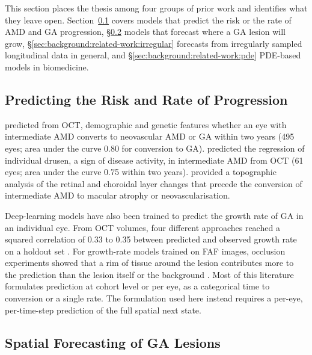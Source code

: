 This section places the thesis among four groups of prior work and
identifies what they leave open.
Section~\ref{sec:background:related-work:rate} covers models that predict
the risk or the rate of AMD and GA progression,
\S\ref{sec:background:related-work:spatial} models that forecast where a
GA lesion will grow, \S\ref{sec:background:related-work:irregular}
forecasts from irregularly sampled longitudinal data in general, and
\S\ref{sec:background:related-work:pde} PDE-based models in biomedicine.

\subsection{Predicting the Risk and Rate of Progression}
\label{sec:background:related-work:rate}

\citet{SchmidtErfurth2018} predicted from OCT, demographic and genetic
features whether an eye with intermediate AMD converts to neovascular AMD
or GA within two years (495 eyes; area under the curve 0.80 for
conversion to GA). \citet{Bogunovic2017} predicted the regression of
individual drusen, a sign of disease activity, in intermediate AMD from
OCT (61 eyes; area under the curve 0.75 within two years).
\citet{Vogl2021} provided a topographic analysis of the retinal
and choroidal layer changes that precede the conversion of intermediate
AMD to macular atrophy or neovascularisation.

Deep-learning models have also been trained to predict the growth rate
of GA in an individual eye. From OCT volumes, four different approaches
reached a squared correlation of 0.33 to 0.35 between predicted and
observed growth rate on a holdout set \citep{Yoshida2025}. For growth-rate
models trained on FAF images, occlusion experiments showed that a rim of
tissue around the lesion contributes more to the prediction than the
lesion itself or the background \citep{Cluceru2024}. Most of this
literature formulates prediction at cohort level or per eye, as a
categorical time to conversion or a single rate. The formulation used here
instead requires a per-eye, per-time-step prediction of the full spatial
next state.

\subsection{Spatial Forecasting of GA Lesions}
\label{sec:background:related-work:spatial}

